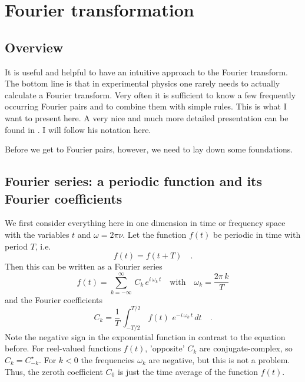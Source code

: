 \renewcommand{\lastmod}{September 18, 2023}
\renewcommand{\chapterauthors}{Markus Lippitz}

\chapter{Fourier transformation}

\section{Overview}

It is useful and helpful to have an intuitive approach to the Fourier transform. The bottom line is that in experimental physics one rarely needs to actually calculate a Fourier transform. Very often it is sufficient to know a few frequently occurring Fourier pairs and to combine them with simple rules. This is what I want to present here. A very nice and much more detailed presentation can be found in \cite{Butz2015}. I will follow his notation here.

Before we get to Fourier pairs, however, we need to lay down some foundations.

\section{Fourier series: a periodic function and its Fourier coefficients}

We first consider everything here in one dimension in time or frequency space with the variables $t$ and $\omega = 2 \pi \nu$. Let the function $f(t)$ be periodic in time with period $T$, i.e. 
\begin{equation}
 f(t) = f (t + T) \quad .
\end{equation}
Then this can be written as a Fourier series
\begin{equation}
 f(t) = \sum_{k=-\infty}^{\infty} \, C_k \, e^{i \, \omega_k \, t}
 \quad \text{with} \quad \omega_k = \frac{2 \pi \, k}{T}
\end{equation}
and the Fourier coefficients
\begin{equation}
 C_k = \frac{1}{T} \, \int_{-T/2}^{T/2} \, f(t) \, \, e^{-i \, \omega_k \, t} \, dt \quad .
\end{equation}
Note the negative sign in the exponential function in contrast to the equation before. For reel-valued functions $f(t)$, 'opposite' $C_k$ are conjugate-complex, so $C_k = C_{-k}^\star$. For $k<0$ the frequencies $\omega_k$ are negative, but this is not a problem. Thus, the zeroth coefficient $C_0$ is just the time average of the function $f(t)$.



